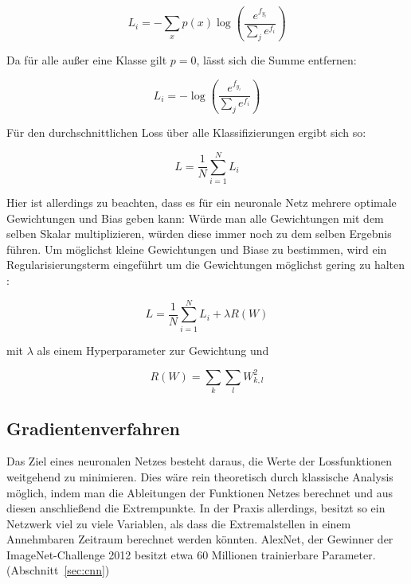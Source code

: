 \begin{equation}
L_i = -\sum_x p(x)\log\left(\frac{e^{f_{y_i}}}{\sum_j e^{f_i}}\right)
\end{equation}

Da für alle außer eine Klasse gilt $p=0$, lässt sich die Summe entfernen:

\begin{equation}
L_i = -\log\left(\frac{e^{f_{y_i}}}{\sum_j e^{f_i}}\right)
\end{equation}


Für den durchschnittlichen Loss über alle Klassifizierungen ergibt sich so:

\begin{equation}
L = \frac{1}{N}\sum_{i=1}^{N}L_i
\end{equation}

Hier ist allerdings zu beachten, dass es für ein neuronale Netz mehrere optimale Gewichtungen und Bias geben kann: Würde man \bspw alle Gewichtungen mit dem selben Skalar multiplizieren, würden diese immer noch zu dem selben Ergebnis führen. Um möglichst kleine Gewichtungen und Biase zu bestimmen, wird ein Regularisierungsterm eingeführt um die Gewichtungen möglichst gering zu halten \cite{cs231n}:

\begin{equation}
\label{eqn:def_loss}
L = \frac{1}{N}\sum_{i=1}^{N}L_i + \lambda R(W)
\end{equation}

mit $\lambda$ als einem Hyperparameter zur Gewichtung und

\begin{equation}
R(W) = \sum_k\sum_l W^2_{k,l}
\end{equation}

\subsection{Gradientenverfahren}
\label{ssec:gradientenverfahren}

Das Ziel eines neuronalen Netzes besteht daraus, die Werte der Lossfunktionen weitgehend zu minimieren. Dies wäre rein theoretisch durch klassische Analysis möglich, indem man die Ableitungen der Funktionen Netzes berechnet und aus diesen anschließend die Extrempunkte. In der Praxis allerdings, besitzt so ein Netzwerk viel zu viele Variablen, als dass die Extremalstellen in einem Annehmbaren Zeitraum berechnet werden könnten. \cite[Kap.~1]{nielsen_15} AlexNet, der Gewinner der ImageNet-Challenge 2012 besitzt \bspw etwa 60 Millionen trainierbare Parameter. (\Vgl Abschnitt~\ref{sec:cnn})

